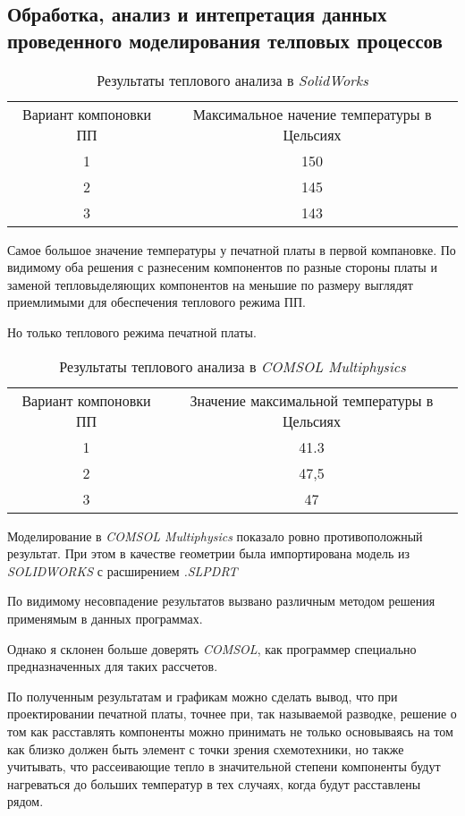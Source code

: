 \subsection{Обработка, анализ и интепретация данных проведенного моделирования телповых процессов}

\begin{table}[h]
  \centering
  \caption{Результаты теплового анализа в \textit{SolidWorks}}
\begin{tabular}{|c|c|}
\hline
  Вариант компоновки ПП & Максимальное начение температуры в Цельсиях \\
  1 &  150 \\
  2 &  145 \\
  3 &  143 \\
\hline
\end{tabular}
\end{table}

Самое большое значение температуры у печатной платы в первой компановке.
По видимому оба решения с разнесеним компонентов по разные стороны платы
и заменой тепловыделяющих компонентов на меньшие по размеру выглядят приемлимыми для обеспечения теплового режима ПП.

Но только теплового режима  печатной платы.

\begin{table}[h]
  \centering
  \caption{Результаты теплового анализа в \textit{COMSOL Multiphysics}}
\begin{tabular}{|c|c|}
\hline
  Вариант компоновки ПП & Значение максимальной температуры в Цельсиях \\
  1 & 41.3 \\
  2 & 47,5 \\
  3 & 47 \\
\hline
\end{tabular}
\end{table}

Моделирование в \textit{COMSOL Multiphysics} показало ровно противоположный результат. При этом в качестве геометрии была импортирована модель из \textit{SOLIDWORKS} с расширением \textit{.SLPDRT}

По видимому несовпадение результатов вызвано различным методом решения применямым в данных программах.

Однако я склонен больше доверять \textit{COMSOL}, как программер специально предназначенных для таких рассчетов.

По полученным результатам и графикам можно сделать вывод,
что при проектировании печатной платы, точнее при, так называемой разводке, решение о том как расставлять компоненты можно принимать
не только основываясь на том как близко должен быть элемент с точки зрения схемотехники, но также учитывать, что рассеивающие тепло в значительной степени компоненты будут нагреваться до больших температур в тех случаях, когда будут расставлены рядом.

\newpage